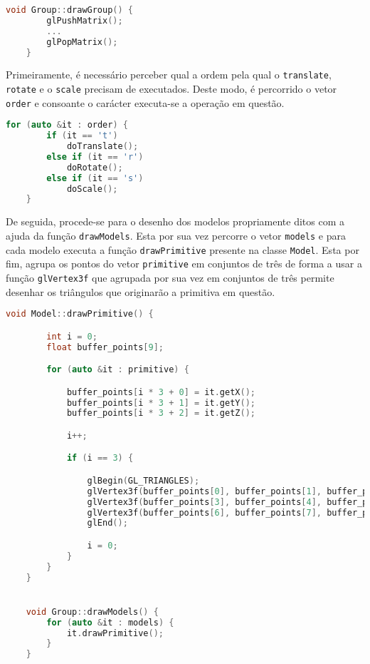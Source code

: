 \documentclass[a4paper]{article}
\begin{document}
\begin{lstlisting}[language=C++, caption=Desenho das primitivas.]
    void Group::drawGroup() {
        glPushMatrix();
        ...
        glPopMatrix();
    }
\end{lstlisting}

Primeiramente, é necessário perceber qual a ordem pela qual o \texttt{translate}, \texttt{rotate} e o \texttt{scale} precisam de executados. Deste modo, é percorrido o vetor \texttt{order} e consoante o carácter executa-se a operação em questão. 

\begin{lstlisting}[language=C++, caption=Preservação da ordem das diretivas.]
    for (auto &it : order) {
        if (it == 't')
            doTranslate();
        else if (it == 'r')
            doRotate();
        else if (it == 's')
            doScale();
    }
\end{lstlisting}

De seguida, procede-se para o desenho dos modelos propriamente ditos com a ajuda da função \texttt{drawModels}. Esta por sua vez percorre o vetor \texttt{models} e para cada modelo executa a função \texttt{drawPrimitive} presente na classe \texttt{Model}. Esta por fim, agrupa os pontos do vetor \texttt{primitive} em conjuntos de três de forma a usar a função \texttt{glVertex3f} que agrupada por sua vez em conjuntos de três permite desenhar os triângulos que originarão a primitiva em questão.


\begin{lstlisting}[language=C++, caption=Desenho dos modelos.]
    void Model::drawPrimitive() {

        int i = 0;
        float buffer_points[9];

        for (auto &it : primitive) {

            buffer_points[i * 3 + 0] = it.getX();
            buffer_points[i * 3 + 1] = it.getY();
            buffer_points[i * 3 + 2] = it.getZ();

            i++;

            if (i == 3) {

                glBegin(GL_TRIANGLES);
                glVertex3f(buffer_points[0], buffer_points[1], buffer_points[2]);
                glVertex3f(buffer_points[3], buffer_points[4], buffer_points[5]);
                glVertex3f(buffer_points[6], buffer_points[7], buffer_points[8]);
                glEnd();

                i = 0;
            }
        }
    }


    void Group::drawModels() {
        for (auto &it : models) {
            it.drawPrimitive();
        }
    }
\end{lstlisting}
\end{document}
